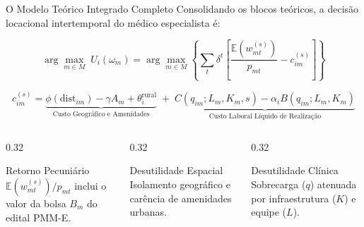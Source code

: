 \documentclass[aspectratio=169, 10pt]{beamer}
\begin{document}
\begin{frame}{O Modelo Teórico Integrado Completo}
  Consolidando os blocos teóricos, a decisão locacional intertemporal do médico especialista é:

  \begin{equation}
    \arg\max_{m \in M}\; U_i(\omega_m) = \arg\max_{m \in M} \left\{ \sum_{t} \delta^t \left[ \frac{\mathbb{E}\!\left(w_{mt}^{(s)}\right)}{p_{mt}} - c_{im}^{(s)} \right] \right\}
  \end{equation}

  \vspace{-0.1cm}
  \begin{equation}
    c_{im}^{(s)} = \underbrace{\phi(\text{dist}_{im}) - \gamma A_m + \theta_i^{\text{rural}}}_{\text{Custo Geográfico e Amenidades}} \;+\; \underbrace{C(q_{im}; L_m, K_m, s) - \alpha_i B(q_{im}; L_m, K_m)}_{\text{Custo Laboral Líquido de Realização}}
  \end{equation}

  \begin{columns}[T]
    \begin{column}{0.32\textwidth}
      \begin{exampleblock}{Retorno Pecuniário}
        $\mathbb{E}(w_{mt}^{(s)}) / p_{mt}$ inclui o valor da bolsa $B_m$ do edital PMM-E.
      \end{exampleblock}
    \end{column}
    \begin{column}{0.32\textwidth}
      \begin{exampleblock}{Desutilidade Espacial}
        Isolamento geográfico e carência de amenidades urbanas.
      \end{exampleblock}
    \end{column}
    \begin{column}{0.32\textwidth}
      \begin{exampleblock}{Desutilidade Clínica}
        Sobrecarga ($q$) atenuada por infraestrutura ($K$) e equipe ($L$).
      \end{exampleblock}
    \end{column}
  \end{columns}
\end{frame}
\end{document}
